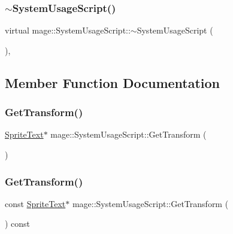\subsubsection{\texorpdfstring{$\sim$\+System\+Usage\+Script()}{~SystemUsageScript()}}
{\footnotesize\ttfamily virtual mage\+::\+System\+Usage\+Script\+::$\sim$\+System\+Usage\+Script (\begin{DoxyParamCaption}{ }\end{DoxyParamCaption})\hspace{0.3cm}{\ttfamily [virtual]}, {\ttfamily [default]}}



\subsection{Member Function Documentation}
\hypertarget{classmage_1_1_system_usage_script_ad8291c309495bd06cd6878814bc422c9}{}\label{classmage_1_1_system_usage_script_ad8291c309495bd06cd6878814bc422c9} 
\subsubsection{\texorpdfstring{Get\+Transform()}{GetTransform()}\hspace{0.1cm}{\footnotesize\ttfamily [1/2]}}
{\footnotesize\ttfamily \hyperlink{classmage_1_1_sprite_text}{Sprite\+Text}$\ast$ mage\+::\+System\+Usage\+Script\+::\+Get\+Transform (\begin{DoxyParamCaption}{ }\end{DoxyParamCaption})}

\hypertarget{classmage_1_1_system_usage_script_ac6f33a63937537375821d7780859a83e}{}\label{classmage_1_1_system_usage_script_ac6f33a63937537375821d7780859a83e} 
\subsubsection{\texorpdfstring{Get\+Transform()}{GetTransform()}\hspace{0.1cm}{\footnotesize\ttfamily [2/2]}}
{\footnotesize\ttfamily const \hyperlink{classmage_1_1_sprite_text}{Sprite\+Text}$\ast$ mage\+::\+System\+Usage\+Script\+::\+Get\+Transform (\begin{DoxyParamCaption}{ }\end{DoxyParamCaption}) const}

